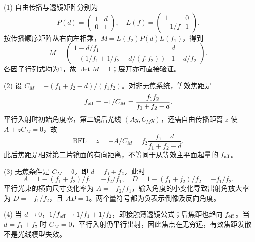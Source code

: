 (1) 自由传播与透镜矩阵分别为
\[
P(d)=\begin{pmatrix}1&d\\0&1\end{pmatrix},\quad
L(f)=\begin{pmatrix}1&0\\-1/f&1\end{pmatrix}.
\]
按传播顺序矩阵从右向左相乘，\(M=L(f_2)P(d)L(f_1)\)，得到
\[
M=\begin{pmatrix}1-d/f_1&d\\-(1/f_1+1/f_2-d/(f_1f_2))&1-d/f_2\end{pmatrix}.
\]
各因子行列式均为1，故 \(\det M=1\)；展开亦可直接验证。

(2) 设 \(C_M=-(f_1+f_2-d)/(f_1f_2)\)。对非无焦系统，等效焦距是
\[
f_{\rm eff}=-1/C_M=\frac{f_1f_2}{f_1+f_2-d}.
\]
平行入射时初始角度零，第二镜后光线 \((Ay,C_My)\)，还需自由传播距离 \(z\) 使 \(A+zC_M=0\)，故
\[
\mathrm{BFL}=z=-A/C_M=f_2\frac{f_1-d}{f_1+f_2-d}.
\]
此后焦距是相对第二片镜面的有向距离，不等同于从等效主平面起量的 \(f_{\rm eff}\)。

(3) 无焦条件是 \(C_M=0\)，即 \(d=f_1+f_2\)，此时
\[
A=1-(f_1+f_2)/f_1=-f_2/f_1,\quad D=1-(f_1+f_2)/f_2=-f_1/f_2.
\]
平行光束的横向尺寸变化率为 \(A=-f_2/f_1\)，输入角度的小变化导致出射角放大率为 \(D=-f_1/f_2\)，且 \(AD=1\)。两个量符号都为负表示倒像及反向角度。

(4) 当 \(d\to0\)，\(1/f_{\rm eff}\to1/f_1+1/f_2\)，即接触薄透镜公式；后焦距也趋向 \(f_{\rm eff}\)。当 \(d=f_1+f_2\) 时 \(C_M=0\)，平行入射仍平行出射，因此焦点在无穷远，有效焦距发散不是光线模型失效。
